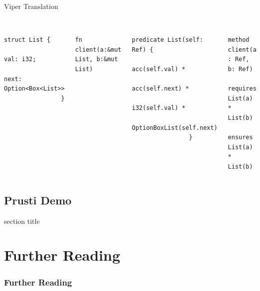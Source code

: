 \documentclass[usenames,dvipsnames,aspectratio=169]{beamer}
\begin{document}
\begin{frame}[fragile]{Viper Translation}
    \begin{columns}
        \begin{block}{}
            \begin{verbatim}
                struct List {
                    val: i32;
                    next: Option<Box<List>>
                }
            \end{verbatim}
        \end{block}
        \begin{block}{}
            \begin{verbatim}
                fn client(a:&mut List, b:&mut List)
            \end{verbatim}
        \end{block}

        \begin{block}{}
            \begin{verbatim}
                predicate List(self: Ref) {
                    acc(self.val) *
                    acc(self.next) *
                    i32(self.val) *
                    OptionBoxList(self.next)
                }
            \end{verbatim}
        \end{block}
        \begin{block}{}
            \begin{verbatim}
                method client(a : Ref, b: Ref)
                    requires List(a) * List(b)
                    ensures List(a) * List(b)
            \end{verbatim}
        \end{block}
    \end{columns}
\end{frame}

\subsection{Prusti Demo}
\begin{frame}
    \begingroup
    \begin{beamercolorbox}[sep=12pt,center]{section title}
    \end{beamercolorbox}
    \endgroup
\end{frame}

\section{Further Reading}
\begin{frame}[allowframebreaks]
    \frametitle{Further Reading}
    \nocite{*}
    \printbibliography
\end{frame}
    
\end{document}
